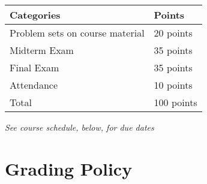 \documentclass[12pt]{article}
\begin{document}
\newlength\q
\setlength{}
\begin{tabular}{|p{\q}|p{\q}|}
    \hline
    Categories  & Points \\
    \hline
    \hline
    Problem sets on course material   & 20 points \\
    \hline
    Midterm Exam & 35 points \\
    \hline
    Final Exam & 35 points \\
    \hline
    Attendance & 10 points \\
    \hline
    Total & 100 points \\
    \hline
\end{tabular}
\textit{See course schedule, below, for due dates}


\section*{Grading Policy}






\end{document}
